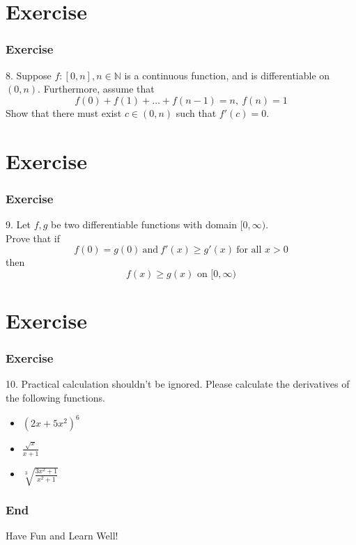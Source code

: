 \documentclass[12pt, t]{beamer}
\begin{document}
\section{Exercise}
\begin{frame}
    \frametitle{Exercise}
8. Suppose $f:[0,n],n\in \mathbb{N}$ is a continuous function, and is differentiable on $(0,n)$. Furthermore, assume that 
\begin{equation*}
    f(0)+f(1)+\dots+f(n-1)=n,\ f(n)=1
\end{equation*} 
Show that there must exist $c\in (0,n)$ such that $f'(c)=0$.

\end{frame}


\section{Exercise}
\begin{frame}
    \frametitle{Exercise}
9. Let $f,g$ be two differentiable functions with domain $[0,\infty)$.\\
Prove that if
\begin{equation*}
    f(0)=g(0)\ \text{and} \ f'(x)\geq g'(x)\ \text{for all }x>0
\end{equation*}
then 
\begin{equation*}
    f(x)\geq g(x) \text{ on } [0,\infty)
\end{equation*}

\end{frame}


\section{Exercise}
\begin{frame}
    \frametitle{Exercise}
10. Practical calculation shouldn't be ignored. Please calculate the derivatives of the following functions.
\begin{itemize}
    \item $(2x+5x^2)^6$
    \vspace{0.3em}
    \item $\frac{\sqrt{x}}{x+1}$
    \vspace{0.3em}
    \item $\sqrt[3]{\frac{3x^2+1}{x^2+1}}$
\end{itemize}
    
\end{frame}

\begin{frame}
    \frametitle{End}
    \vspace{2cm}
    \Huge \center  Have Fun and Learn Well!
\end{frame}
\end{document}
